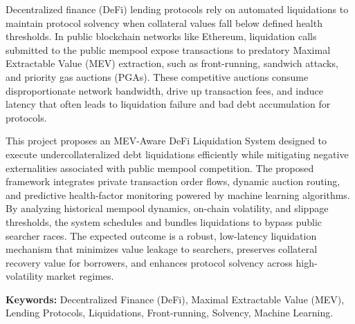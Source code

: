 
Decentralized finance (DeFi) lending protocols rely on automated liquidations to maintain protocol solvency when collateral values fall below defined health thresholds. In public blockchain networks like Ethereum, liquidation calls submitted to the public mempool expose transactions to predatory Maximal Extractable Value (MEV) extraction, such as front-running, sandwich attacks, and priority gas auctions (PGAs). These competitive auctions consume disproportionate network bandwidth, drive up transaction fees, and induce latency that often leads to liquidation failure and bad debt accumulation for protocols.

This project proposes an MEV-Aware DeFi Liquidation System designed to execute undercollateralized debt liquidations efficiently while mitigating negative externalities associated with public mempool competition. The proposed framework integrates private transaction order flows, dynamic auction routing, and predictive health-factor monitoring powered by machine learning algorithms. By analyzing historical mempool dynamics, on-chain volatility, and slippage thresholds, the system schedules and bundles liquidations to bypass public searcher races. The expected outcome is a robust, low-latency liquidation mechanism that minimizes value leakage to searchers, preserves collateral recovery value for borrowers, and enhances protocol solvency across high-volatility market regimes.

\vspace{1.5em}
\noindent\textbf{Keywords:} Decentralized Finance (DeFi), Maximal Extractable Value (MEV), Lending Protocols, Liquidations, Front-running, Solvency, Machine Learning.
